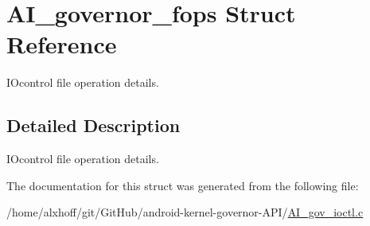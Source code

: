 \hypertarget{structAI__governor__fops}{}\section{A\+I\+\_\+governor\+\_\+fops Struct Reference}
\label{structAI__governor__fops}


I\+Ocontrol file operation details.  




\subsection{Detailed Description}
I\+Ocontrol file operation details. 

The documentation for this struct was generated from the following file\+:\begin{DoxyCompactItemize}
\item 
/home/alxhoff/git/\+Git\+Hub/android-\/kernel-\/governor-\/\+A\+P\+I/\hyperlink{AI__gov__ioctl_8c}{A\+I\+\_\+gov\+\_\+ioctl.\+c}\end{DoxyCompactItemize}

